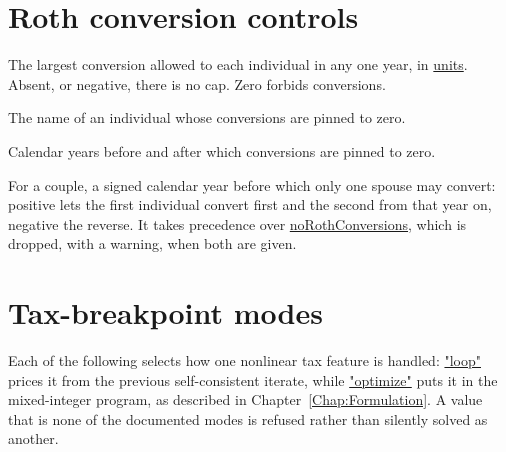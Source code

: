 \documentclass[fleqn,12pt]{report}
\newcommand{\code}[1]{\url{#1}}
\begin{document}
\section{Roth conversion controls}

\begin{description}[style=nextline, leftmargin=1.5cm, font=\ttfamily]
\item[maxRothConversion]
The largest conversion allowed to each individual in any one year, in
\code{units}.  Absent, or negative, there is no cap.  Zero forbids conversions.
\item[noRothConversions]
The name of an individual whose conversions are pinned to zero.
\item[startRothConversions, stopRothConversions]
Calendar years before and after which conversions are pinned to zero.
\item[swapRothConverters]
For a couple, a signed calendar year before which only one spouse may convert:
positive lets the first individual convert first and the second from that year
on, negative the reverse.  It takes precedence over \code{noRothConversions},
which is dropped, with a warning, when both are given.
\end{description}

\section{Tax-breakpoint modes}

Each of the following selects how one nonlinear tax feature is handled:
\code{"loop"} prices it from the previous self-consistent iterate, while
\code{"optimize"} puts it in the mixed-integer program, as described in
Chapter~\ref{Chap:Formulation}.
A value that is none of the documented modes is refused rather than silently
solved as another.
\end{document}
